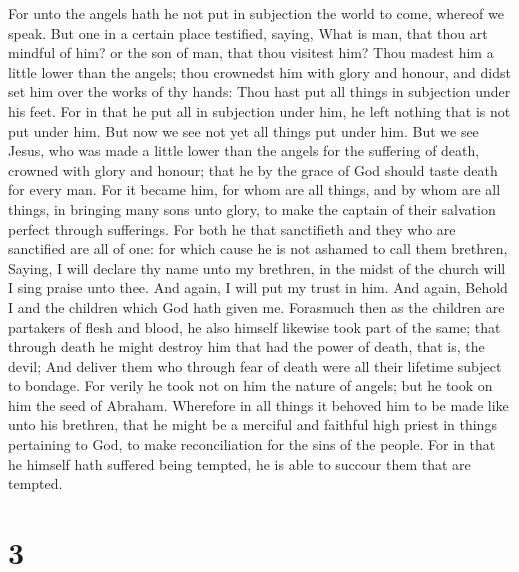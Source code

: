  For unto the angels hath he not put in subjection the
world to come, whereof we speak.  But one in a certain
place testified, saying, What is man, that thou art mindful of him? or
the son of man, that thou visitest him?  Thou madest him a
little lower than the angels; thou crownedst him with glory and honour,
and didst set him over the works of thy hands:  Thou hast
put all things in subjection under his feet. For in that he put all in
subjection under him, he left nothing that is not put under him. But now
we see not yet all things put under him.  But we see
Jesus, who was made a little lower than the angels for the suffering of
death, crowned with glory and honour; that he by the grace of God should
taste death for every man.  For it became him, for whom
are all things, and by whom are all things, in bringing many sons unto
glory, to make the captain of their salvation perfect through
sufferings.  For both he that sanctifieth and they who
are sanctified are all of one: for which cause he is not ashamed to call
them brethren,  Saying, I will declare thy name unto my
brethren, in the midst of the church will I sing praise unto thee.
 And again, I will put my trust in him. And again, Behold
I and the children which God hath given me.  Forasmuch
then as the children are partakers of flesh and blood, he also himself
likewise took part of the same; that through death he might destroy him
that had the power of death, that is, the devil;  And
deliver them who through fear of death were all their lifetime subject
to bondage.  For verily he took not on him the nature of
angels; but he took on him the seed of Abraham. 
Wherefore in all things it behoved him to be made like unto his
brethren, that he might be a merciful and faithful high priest in things
pertaining to God, to make reconciliation for the sins of the people.
 For in that he himself hath suffered being tempted, he
is able to succour them that are tempted.

\hypertarget{section-2}{%
\section{3}\label{section-2}}

